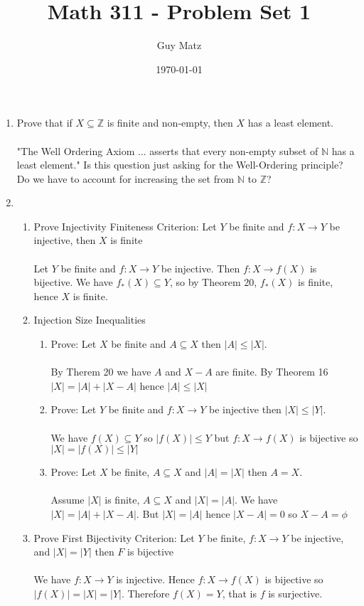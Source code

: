 \documentclass[11pt]{article}
\title{\textbf{Math 311 - Problem Set 1}}
\author{Guy Matz}
\date{\today}
\begin{document}


\begin{enumerate}  %
\item Prove that if $X \subseteq \mathbb{Z}$ is finite and non-empty, then $X$ has a least element.\\
\\
"The Well Ordering Axiom ... asserts that every non-empty subset of $\mathbb{N}$ has a least element."  Is this question just asking for the Well-Ordering principle?  Do we have to account for increasing the set from $\mathbb{N}$ to $\mathbb{Z}$?

\newpage %
\item
\begin{enumerate}
\item Prove Injectivity Finiteness Criterion:  Let $Y$ be finite and $f : X \to Y$ be injective, then $X$ is finite\\\\
Let $Y$ be finite and $f:X \to Y$ be injective.  Then $f:X \to f(X)$ is bijective.  We have $f_*(X) \subseteq Y$, so by Theorem 20, $f_*(X)$ is finite, hence $X$ is finite.
\item Injection Size Inequalities
\begin{enumerate}
\item Prove: Let $X$ be finite and $A \subseteq X$ then $|A| \leq |X|.$\\\\
By Therem 20 we have $A$ and $X-A$ are finite.  By Theorem 16 $|X| = |A| + |X-A|$ hence $|A| \leq |X|$\\
\item Prove: Let $Y$ be finite and $f:X \to Y$ be injective then $|X| \leq |Y|$.\\\\
We have $f(X) \subseteq Y$ so $|f(X)| \leq Y$ but $f:X \to f(X)$ is bijective so $|X| = |f(X)| \leq |Y|$\\
\item Prove: Let $X$ be finite, $A \subseteq X$ and $|A| = |X|$ then $A = X$.\\\\
Assume $|X|$ is finite, $A \subseteq X$ and $|X| = |A|$.  We have $|X| = |A| + |X-A|$.  But $|X| = |A|$ hence $|X-A| = 0$ so $X-A = \phi$
\end{enumerate}
\item Prove First Bijectivity Criterion:  Let $Y$ be finite, $f:X \to Y$ be injective, and $|X| = |Y|$ then $F$ is bijective\\\\
We have $f: X \to Y$ is injective.  Hence $f:X \to f(X)$ is bijective so $|f(X)| = |X| = |Y|$.  Therefore $f(X) = Y$, that is $f$ is surjective.
\end{enumerate}



\end{enumerate}
\end{document}
